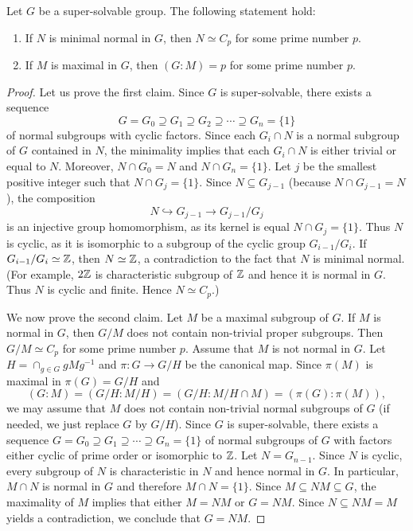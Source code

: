 \begin{theorem}
\label{thm:super_structure}
Let $G$ be a super-solvable group. The following statement hold:  
\begin{enumerate}
\item If $N$ is minimal normal in $G$, then $N\simeq C_p$ for some prime number $p$.
\item If $M$ is maximal in $G$, then $(G:M)=p$ for some prime number $p$.
\end{enumerate}
\end{theorem}

\begin{proof}
Let us prove the first claim. Since $G$ is super-solvable, there exists a sequence 
\[
G=G_0\supseteq G_1\supseteq
G_2\supseteq\cdots\supseteq G_n=\{1\}
\]
of normal subgroups with cyclic factors. Since 
each $G_i\cap N$ is a normal subgroup of $G$ contained in $N$, 
the minimality implies that 
each $G_i\cap N$ is either trivial or equal to $N$. Moreover, $N\cap G_0=N$ and $N\cap
G_n=\{1\}$. Let $j$ be the smallest positive integer such that $N\cap G_j=\{1\}$. 
Since $N\subseteq G_{j-1}$ (because $N\cap G_{j-1}=N$), the composition 
	\[
	N\hookrightarrow G_{j-1}\to G_{j-1}/G_j
	\]
is an injective group homomorphism, as its kernel is equal $N\cap G_{j}=\{1\}$. 
Thus $N$ is cyclic, as it is isomorphic to a subgroup of the cyclic group $G_{i-1}/G_i$. 
If $G_{i-1}/G_i\simeq\mathbb{Z}$, then $N\simeq\mathbb{Z}$, a contradiction to the fact that $N$ is minimal normal. (For example, 
$2\mathbb{Z}$ is characteristic subgroup of $\mathbb{Z}$ and hence it is normal in $G$. Thus $N$ is cyclic and finite. Hence $N\simeq C_p$.)

We now prove the second claim. Let $M$ be a maximal subgroup of $G$. If $M$ is normal in $G$, 
then $G/M$ does not contain non-trivial proper subgroups. Then 
$G/M\simeq C_p$ for some prime number $p$. Assume that $M$ is not normal in $G$. 
Let $H=\cap_{g\in G}gMg^{-1}$ and $\pi\colon G\to G/H$ be the canonical map.  
Since $\pi(M)$ is maximal in 
	$\pi(G)=G/H$ and 
	\[
		(G:M)=(G/H:M/H)=(G/H:M/H\cap M)=(\pi(G):\pi(M)),
	\]
we may assume that $M$ does not contain non-trivial normal subgroups of $G$ (if needed, 
we just replace $G$ by $G/H$). Since $G$ is super-solvable, there exists a sequence 
$G=G_0\supseteq G_1\supseteq\cdots\supseteq G_n=\{1\}$ of normal subgroups of $G$ 
with factors either cyclic of prime order or isomorphic to $\mathbb{Z}$. Let 
$N=G_{n-1}$. Since $N$ is cyclic, every subgroup of $N$ is characteristic 
in $N$ and hence normal in $G$. In particular, $M\cap N$ is normal in 
$G$ and therefore $M\cap N=\{1\}$. Since $M\subseteq
NM\subseteq G$, the maximality of $M$ implies that either $M=NM$ or $G=NM$.
Since $N\subseteq NM=M$ yields a contradiction, we conclude that $G=NM$.


\end{proof}
